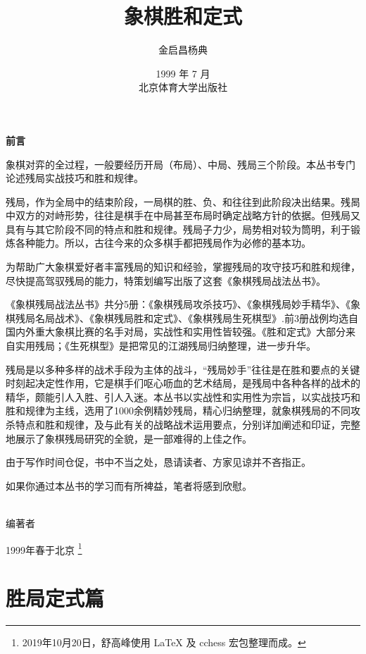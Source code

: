 \documentclass[UTF8]{ctexbook}
\title{象棋胜和定式}
\author{金启昌\quad 杨\quad 典}
\date{1999 年 7 月  \\ \vspace{14cm} 北京体育大学出版社
}
\begin{document}
\maketitle

\thispagestyle{empty}
\begin{center}
{\textbf{前言} }
\end{center}
\vspace{3cm}

象棋对弈的全过程，一般要经历开局（布局）、中局、残局三个阶段。本丛书专门论述残局实战技巧和胜和规律。

残局，作为全局中的结束阶段，一局棋的胜、负、和往往到此阶段决出结果。残晑中双方的对峙形势，往往是棋手在中局甚至布局时确定战略方针的依据。但残局又具有与其它阶段不同的特点和胜和规律。残局子力少，局势相对较为筒明，利于锻炼各种能力。所以，古往今来的众多棋手都把残局作为必修的基本功。

为帮助广大象棋爱好者丰富残局的知识和经验，掌握残局的攻守技巧和胜和规律，尽快提高驾驭残局的能力，特策划编写出版了这套《象棋残局战法丛书》。

《象棋残局战法丛书》共分5册：《象棋残局攻杀技巧》、《象棋残局妙手精华》、《象棋残局名局战术》、《象棋残局胜和定式》、《象棋残局生死棋型》.前3册战例均选自国内外重大象棋比赛的名手对局，实战性和实用性皆较强。《胜和定式》大部分来自实用残局；《生死棋型》是把常见的江湖残局归纳整理，进一步升华。

残局是以多种多样的战术手段为主体的战斗，“残局妙手”往往是在胜和要点的关键时刻起决定性作用，它是棋手们呕心呖血的艺术结局，是残局中各种各样的战术的精华，颇能引人入胜、引人入迷。本丛书以实战性和实用性为宗旨，以实战技巧和胜和规律为主线，选用了1000余例精妙残局，精心归纳整理，就象棋残局的不同攻杀特点和胜和规律，及与此有关的战略战术运用要点，分别详加阐述和印证，完整地展示了象棋残局研究的全貌，是一部难得的上佳之作。

由于写作时间仓促，书中不当之处，恳请读者、方家见谅并不吝指正。

如果你通过本丛书的学习而有所裨益，笔者将感到欣慰。

~\\

编著者

1999年春于北京 \footnote{2019年10月20日，舒高峰使用 \LaTeX{} 及 cchess 宏包整理而成。}


\clearpage
\tableofcontents
\thispagestyle{empty}


\clearpage
\chapter{胜局定式篇}
\setcounter{page}{1}
\end{document}
